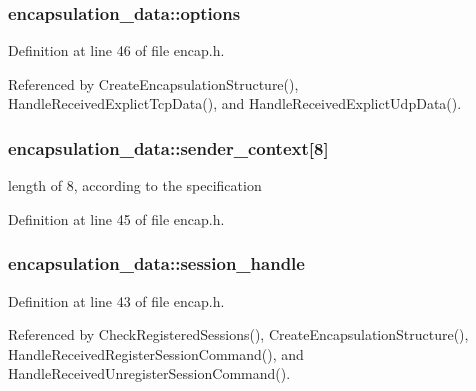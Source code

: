 \hypertarget{structencapsulation__data_a09f1929110e91e6dc506b23eede7900a}{
\subsubsection[{options}]{ {\bf encapsulation\-\_\-data\-::options}}}\label{d9/d42/structencapsulation__data_a09f1929110e91e6dc506b23eede7900a}


\-Definition at line 46 of file encap.\-h.



\-Referenced by \-Create\-Encapsulation\-Structure(), \-Handle\-Received\-Explict\-Tcp\-Data(), and \-Handle\-Received\-Explict\-Udp\-Data().

\hypertarget{structencapsulation__data_a8eb70ef3d00610457050d85ad1b13b75}{
\subsubsection[{sender\-\_\-context}]{ {\bf encapsulation\-\_\-data\-::sender\-\_\-context}\mbox{[}8\mbox{]}}}\label{d9/d42/structencapsulation__data_a8eb70ef3d00610457050d85ad1b13b75}
length of 8, according to the specification 

\-Definition at line 45 of file encap.\-h.

\hypertarget{structencapsulation__data_ab67e9ddf3cb33c0e5246e82b3c1a6fa9}{
\subsubsection[{session\-\_\-handle}]{ {\bf encapsulation\-\_\-data\-::session\-\_\-handle}}}\label{d9/d42/structencapsulation__data_ab67e9ddf3cb33c0e5246e82b3c1a6fa9}


\-Definition at line 43 of file encap.\-h.



\-Referenced by \-Check\-Registered\-Sessions(), \-Create\-Encapsulation\-Structure(), \-Handle\-Received\-Register\-Session\-Command(), and \-Handle\-Received\-Unregister\-Session\-Command().

